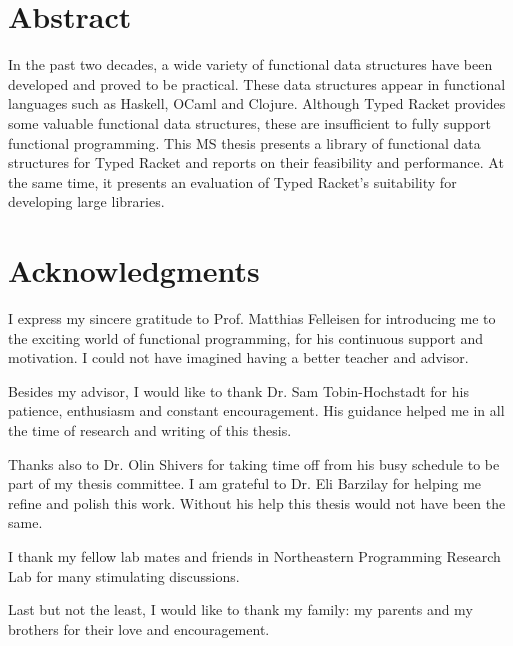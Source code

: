 \documentclass[12pt,final,twoside]{ThesisStyle}
\begin{document}
 

\section*{Abstract}
In the past two decades, a wide variety of functional data structures
have been developed and proved to be practical. These data structures
appear in functional languages such as Haskell, OCaml and
Clojure. Although Typed Racket provides some valuable functional data
structures, these are insufficient to fully support functional
programming. This MS thesis presents a library of functional data
structures for Typed Racket and reports on their feasibility and
performance. At the same time, it presents an evaluation of Typed
Racket's suitability for developing large libraries.

\clearpage

\section*{Acknowledgments}
 
I express my sincere gratitude to Prof. Matthias Felleisen for
introducing me to the exciting world of functional programming, for his
continuous support and motivation. I could not have imagined having a
better teacher and advisor.

Besides my advisor, I would like to thank Dr. Sam Tobin-Hochstadt for
his patience, enthusiasm and constant encouragement. His guidance helped
me in all the time of research and writing of this thesis.

Thanks also to Dr. Olin Shivers for taking time off from his busy
schedule to be part of my thesis committee. I am grateful to Dr. Eli
Barzilay for helping me refine and polish this work. Without his help
this thesis would not have been the same.

I thank my fellow lab mates and friends in Northeastern Programming
Research Lab for many stimulating discussions.

Last but not the least, I would like to thank my family: my parents and
my brothers for their love and encouragement.

\tableofcontents

\mainmatter














%

%


%
%



\end{document}
